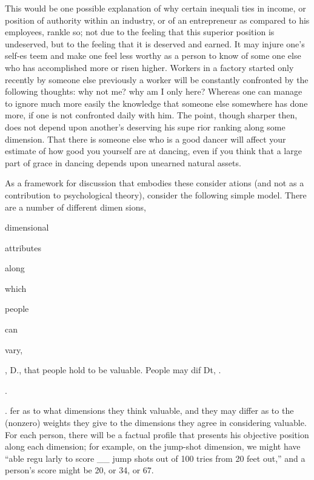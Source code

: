 \documentclass[11pt,openany]{book}
\begin{document}
This would be one possible explanation of why certain inequali ties in income, or position of authority within an industry, or of an entrepreneur as compared to his employees, rankle so; not due to the feeling that this superior position is undeserved, but to the feeling that it is deserved and earned. It may injure one's self-es teem and make one feel less worthy as a person to know of some one else who has accomplished more or risen higher. Workers in a factory started only recently by someone else previously a worker will be constantly confronted by the following thoughts: why not me? why am I only here? Whereas one can manage to ignore much more easily the knowledge that someone else somewhere has done more, if one is not confronted daily with him. The point, though sharper then, does not depend upon another's deserving his supe rior ranking along some dimension. That there is someone else who is a good dancer will affect your estimate of how good you yourself are at dancing, even if you think that a large part of grace in dancing depends upon unearned natural assets. 

As a framework for discussion that embodies these consider ations (and not as a contribution to psychological theory), consider the following simple model. There are a number of different dimen sions, 

dimensional 

attributes 

along 

which 

people 

can 

vary, 

 , D., that people hold to be valuable. People may dif Dt, .

.

. fer as to what dimensions they think valuable, and they may differ as to the (nonzero) weights they give to the dimensions they agree in considering valuable. For each person, there will be a factual profile that presents his objective position along each dimension; for example, on the jump-shot dimension, we might have ``able regu larly to score \_\_ jump shots out of 100 tries from 20 feet out,'' and a person's score might be 20, or 34, or 67. 
\end{document}
